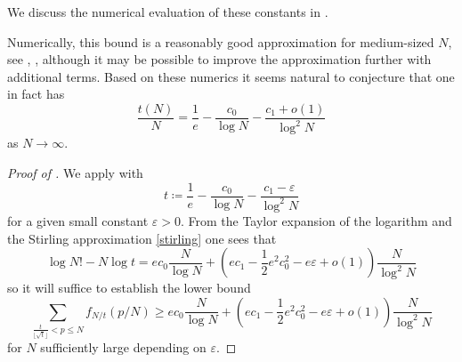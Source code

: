 \documentclass[10pt,a4paper,reqno]{amsart}
\numberwithin{equation}{section}
\theoremstyle{plain}
\theoremstyle{definition}
\newcommand\eps{\varepsilon}
\begin{document}
We discuss the numerical evaluation of these constants in .

  Numerically, this bound is a reasonably good approximation for medium-sized $N$, see , , although it may be possible to improve the approximation further with additional terms.  Based on these numerics it seems natural to conjecture that one in fact has
  $$\frac{t(N)}{N} = \frac{1}{e} - \frac{c_0}{\log N} - \frac{c_1 + o(1)}{\log^2 N}$$
as $N \to \infty$.

    \begin{proof}[Proof of ]
    We apply  with
      $$ t \coloneqq \frac{1}{e} - \frac{c_0}{\log N} - \frac{c_1-\eps}{\log^2 N}$$
    for a given small constant $\eps>0$.  From the Taylor expansion of the logarithm and the Stirling approximation \eqref{stirling} one sees that
    $$ \log N! - N \log t = ec_0 \frac{N}{\log N} + (ec_1 - \frac{1}{2} e^2 c_0^2 - e\eps+o(1)) \frac{N}{\log^2 N}$$
    so it will suffice to establish the lower bound
    \begin{equation}\label{targ-sum}
      \sum_{\frac{t}{\lfloor\sqrt{t}\rfloor} < p \leq N} f_{N/t}(p/N) \geq ec_0 \frac{N}{\log N} + (ec_1 - \frac{1}{2} e^2 c_0^2 - e \eps + o(1)) \frac{N}{\log^2 N}
    \end{equation}
    for $N$ sufficiently large depending on $\eps$.


\end{proof}
\end{document}
